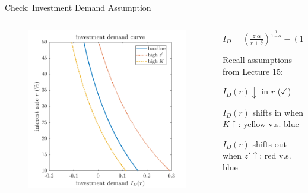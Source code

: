 \documentclass[11pt,aspectratio=169,usenames,dvipsnames]{beamer}
\let\tempone\itemize
\let\temptwo\enditemize
\renewenvironment{itemize}{\tempone\addtolength{\itemsep}{\fill}}{\temptwo}
\begin{document}
\begin{frame}{Check: Investment Demand Assumption}
\label{slide:Check__Investment_Demand_Assumption}
    \begin{columns}
        \begin{column}{0.5\textwidth}
            \begin{figure}
                \includegraphics[width=\textwidth]{./figures/InvestmentDemand.png}
            \end{figure}
        \end{column}
        \begin{column}{0.5\textwidth}
            \begin{center}
                $ \displaystyle
                I_{D} = \left(
                        \frac{z' \alpha}{r+\delta}
                    \right)^{\frac{1}{1-\alpha}}
                    - ( 1-\delta )K
                $
            \end{center}
            Recall assumptions from Lecture 15:
            \begin{itemize}
                \item $ I_{D}( r ) \downarrow $ in $ r $ ($\checkmark$)
                \item $ I_{D}( r ) $ shifts in when $ K \uparrow $: yellow v.s. blue
                \item $ I_{D}( r ) $ shifts out when $ z' \uparrow  $: red v.s. blue
            \end{itemize}
        \end{column}
    \end{columns}
\end{frame}
\end{document}
